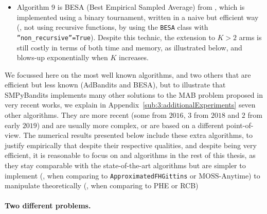 \begin{itemize}
    \item Algorithm 9 is
    BESA (Best Empirical Sampled Average) from \cite{Baransi2014},
    which is implemented using a binary tournament, written in a naive but efficient way
    (\ie, not using recursive functions, by using the \texttt{BESA} class with \texttt{''non\_recursive''=True}).
    Despite this technic, the extension to $K>2$ arms is still costly in terms of both time and memory, as illustrated below, and blows-up exponentially  when $K$ increases.
\end{itemize}

We focussed here on the most well known algorithms, and two others that are efficient but less known (AdBandits and BESA),
but to illustrate that SMPyBandits implements many other solutions to the MAB problem proposed in very recent works, we explain in Appendix~\ref{sub:3:additionalExperiments} seven other algorithms.
They are more recent (some from $2016$, $3$ from $2018$ and $2$ from early $2019$) and are usually more complex, or are based on a different point-of-view.
The numerical results presented below include these extra algorithms, to justify empirically that despite their respective qualities, and despite being very efficient, it is reasonable to focus on \UCB{} and \klUCB{} algorithms in the rest of this thesis, as they stay comparable with the state-of-the-art algorithms but are simpler to implement (\eg, when comparing \UCB{} to \texttt{ApproximatedFHGittins} or $\mathrm{MOSS}$-$\mathrm{Anytime}$) to manipulate theoretically (\eg, when comparing \klUCB{} to PHE or RCB)


\paragraph{Two different problems.}

